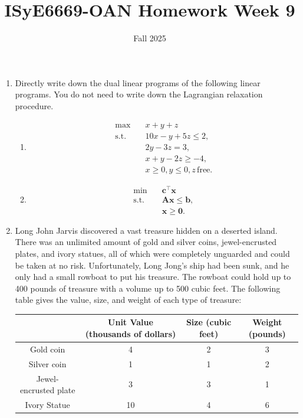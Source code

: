\documentclass[11pt]{article}
\title{ISyE6669-OAN Homework Week 9}
\author{Fall 2025}
\date{}
\def \A{\bm{A}}
\def \b{\bm{b}}
\def \c{\bm{c}}
\def \x{\bm{x}}
\def \0{\bm{0}}
\begin{document}
\maketitle

\begin{enumerate}

    \item Directly write down the dual linear programs of the following linear programs. You do not need to write down the Lagrangian relaxation procedure.
    \begin{enumerate}
        \item \begin{align*}
                \max \quad & x + y + z \\
                \text{s.t.}\quad & 10x - y + 5z \le 2, \\
                & 2y - 3z = 3,\\
                & x + y - 2z \ge -4,\\
                & x\ge 0, y\le 0, z\, \text{free}.
              \end{align*}
    
        \item \begin{align*}
            \min \quad & \c^\top \x \\
            \text{s.t.}\quad & \A\x \le \b, \\
            & \x\ge \0.
        \end{align*}
    \end{enumerate}

    
    \item Long John Jarvis discovered a vast treasure hidden on a deserted island. There was an unlimited amount of gold and silver coins, jewel-encrusted plates, and ivory statues, all of which were completely unguarded and could be taken at no risk. Unfortunately, Long Jong's ship had been sunk, and he only had a small rowboat to put his treasure. The rowboat could hold up to 400 pounds of treasure with a volume up to 500 cubic feet. The following table gives the value, size, and weight of each type of treasure:

\begin{center}
\begin{tabular}{cccc}
\hline
 & Unit Value (thousands of dollars) & Size (cubic feet) & Weight (pounds) \\
\hline
Gold coin & 4 & 2 & 3 \\
Silver coin & 1 & 1  & 2 \\
Jewel-encrusted plate & 3 & 3 & 1 \\
Ivory Statue & 10 & 4 & 6 \\
\hline
\end{tabular}
\end{center}



\end{enumerate}
\end{document}
